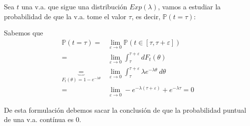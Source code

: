 \documentclass{upmassignment}
\date{\today}
\begin{document}
\begin{problemlist}
    \pbitem 
        Sea $t$ una v.a. que sigue una
        distribución $Exp(\lambda)$, vamos
        a estudiar la probabilidad de que
        la v.a. tome el valor $\tau$,
        es decir, $\mathbb{P}(t=\tau)$:

    \begin{solucion}
        Sabemos que
        \begin{align*}
            \mathbb{P}(t=\tau)=&
            \lim_{\varepsilon\to0}
            \mathbb{P}(t\in[\tau,
            \tau+\varepsilon])\\
            =& \lim_{\varepsilon\to0}
            \int_{\tau}^{\tau+\varepsilon}
            dF_t(\theta)\\
            \underbrace{=}_{F_t(\theta)=
            1-e^{-\lambda\theta}}&
            \lim_{\varepsilon\to0}
            \int_{\tau}^{\tau+\varepsilon}
            \lambda e^{-\lambda\theta}
            \ d\theta\\
            =& \lim_{\varepsilon\to0}
            -e^{-\lambda(\tau+\varepsilon)}
            +e^{-\lambda\tau}=0
        \end{align*}

        De esta formulación debemos sacar
        la conclusión de que la probabilidad
        puntual de una v.a. contínua es 0.
    \end{solucion}

\end{problemlist}
\end{document}
